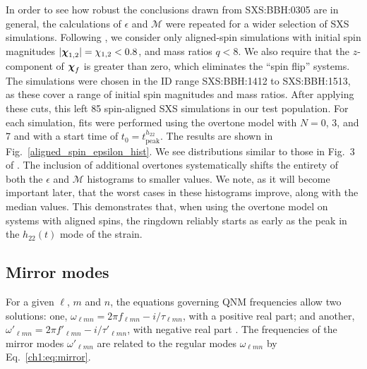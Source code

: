 In order to see how robust the conclusions drawn from SXS:BBH:0305 are in general, the calculations of $\epsilon$ and $\mathcal{M}$ were repeated for a wider selection of SXS simulations. Following \cite{Giesler:2019uxc}, we consider only aligned-spin simulations with initial spin magnitudes $|\vb*{\chi}_{1,2}| = \chi_{1,2} < 0.8$, and mass ratios $q < 8$. We also require that the $z$-component of $\vb*{\chi}_f$ is greater than zero, which eliminates the ``spin flip'' systems. The simulations were chosen in the ID range SXS:BBH:1412 to SXS:BBH:1513, as these cover a range of initial spin magnitudes and mass ratios.
After applying these cuts, this left 85 spin-aligned SXS simulations in our test population.
For each simulation, fits were performed using the overtone model with $N=0$, 3, and 7 and with a start time of $t_0 = t_{\mathrm{peak}}^{h_{22}}$. 
The results are shown in Fig.~\ref{aligned_spin_epsilon_hist}. 
We see distributions similar to those in Fig.~3 of \cite{Giesler:2019uxc}. 
The inclusion of additional overtones systematically shifts the entirety of both the $\epsilon$ and $\mathcal{M}$ histograms to smaller values.
We note, as it will become important later, that the worst cases in these histograms improve, along with the median values.
This demonstrates that, when using the overtone model on systems with aligned spins, the ringdown reliably starts as early as the peak in the $h_{22}(t)$ mode of the strain. 


\subsection{Mirror modes} \label{subsec:mirror_modes}

For a given $\ell$, $m$ and $n$, the equations governing QNM frequencies allow two solutions: one, $\omega_{\ell m n} = 2\pi f_{\ell m n} - i/\tau_{\ell m n}$, with a positive real part; and another, $\omega'_{\ell m n} = 2\pi f'_{\ell m n} - i/ \tau'_{\ell m n}$, with negative real part \cite{Dhani:2020nik, Berti:2005ys}.
The frequencies of the mirror modes $\omega'_{\ell m n}$ are related to the regular modes $\omega_{\ell m n}$ by Eq.~\ref{ch1:eq:mirror}.

